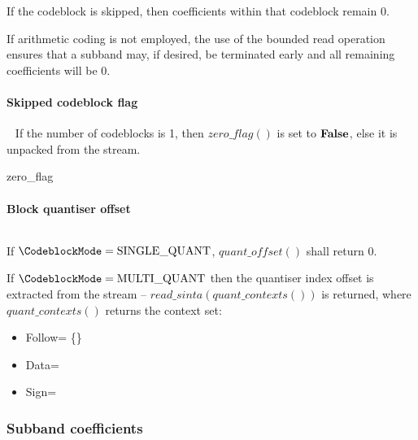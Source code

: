 If the codeblock is skipped, then coefficients within that codeblock remain 0.

\begin{informative}
If arithmetic coding is not employed, the use of the bounded read operation ensures
that a subband may, if desired, be terminated early and all remaining coefficients
will be 0.
\end{informative}

\paragraph{Skipped codeblock flag}
\label{zeroblockflag}
$\ $\newline$\ $\newline
If the number of codeblocks is 1, then $zero\_flag()$ is set to $\text{\bf{False}}$, else
it is unpacked from the stream.

\begin{pseudo}{zero\_flag}{}
    \bsRET{\false}
\bsELSE
\bsEND
\end{pseudo}

\paragraph{Block quantiser offset}
$\ $\newline$\ $\newline
\label{blockquantidx}

If $\CodeblockMode=\SingleQuantiser$,  $quant\_offset()$ shall return 0.

If $\CodeblockMode=\MultipleQuantiser$ then the quantiser index offset
is extracted from the stream -- $read\_sinta(quant\_contexts())$ is returned, where
$quant\_contexts()$ returns the context set:

\begin{itemize}
\item{Follow= \{\QOffsetFollow\}}
\item{Data=\QOffsetData}
\item{Sign=\QOffsetSign}
\end{itemize}

\subsubsection{Subband coefficients}


